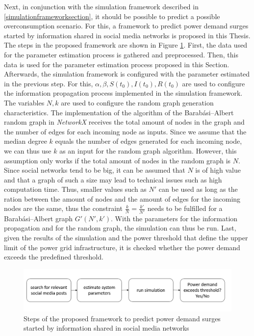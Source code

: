Next, in conjunction with the simulation framework described in 
\ref{simulationframeworksection}, it should be possible to predict 
a possible overconsumption scenario. For this, a framework
to predict power demand surges started by information shared in 
social media networks is proposed in this Thesis. The steps
in the proposed framework are shown in Figure \ref{basicpredicitonframework}.
First, the data used for the parameter estimation process is gathered and
preprocessed. Then, this data is used for the parameter estimation process
proposed in this Section. Afterwards, the simulation framework is configured
with the parameter estimated in the previous step. For this, 
$\alpha, \beta, S(t_0), I(t_0), R(t_0)$ are used to configure the 
information propagation process implemented in the simulation framework.
The variables $N, k$ are used to configure the random graph generation
characteristics. The implementation of the 
algorithm of the Barabási–Albert random graph in \textit{NetworkX}
receives the total amount of nodes in the graph and the number of edges 
for each incoming node as inputs. Since we assume that the median degree
$k$ equals the number of edges generated for each incoming node, we can thus
use $k$ as an input for the random graph algorithm. However, this assumption
only works if the total amount of nodes in the random graph is $N$.
Since social networks tend to be big, it can be assumed that 
$N$ is of high value and that a graph of such a size may lead to technical 
issues such as high computation time. Thus, smaller values such as $N'$
can be used as long as the ration between the amount of nodes and the
amount of edges for the incoming nodes are the same, thus the constraint
$\frac{k}{N}=\frac{k'}{N'}$ needs to be fulfilled for a Barabási–Albert
graph $G'(N',k')$. With the parameters for the information propagation and 
for the random graph, the simulation can thus be run. 
Last, given the results of the simulation and the power threshold
that define the upper limit of the power grid infrastructure, it
is checked whether the power demand exceeds the predefined threshold.


\begin{figure}[!ht]
    \center
    \includegraphics[scale=.65]{figs/full_prediction_framework.png}
    \caption{Steps of the proposed framework to predict power demand surges
    started by information shared in social media networks}
    \label{basicpredicitonframework}
\end{figure}


